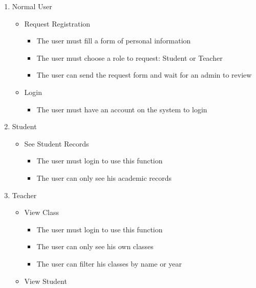 \documentclass[
  letterpaper,
  DIV=11,
  numbers=noendperiod]{scrreprt}
\providecommand{\tightlist}{%
  \setlength{\itemsep}{0pt}\setlength{\parskip}{0pt}}\usepackage{longtable,booktabs,array}
\begin{document}
\begin{enumerate}
\def\labelenumi{\arabic{enumi}.}
\tightlist
\item
  Normal User

  \begin{itemize}
  \tightlist
  \item
    Request Registration

    \begin{itemize}
    \tightlist
    \item
      The user must fill a form of personal information
    \item
      The user must choose a role to request: Student or Teacher
    \item
      The user can send the request form and wait for an admin to review
    \end{itemize}
  \item
    Login

    \begin{itemize}
    \tightlist
    \item
      The user must have an account on the system to login
    \end{itemize}
  \end{itemize}
\item
  Student

  \begin{itemize}
  \tightlist
  \item
    See Student Records

    \begin{itemize}
    \tightlist
    \item
      The user must login to use this function
    \item
      The user can only see his academic records
    \end{itemize}
  \end{itemize}
\item
  Teacher

  \begin{itemize}
  \tightlist
  \item
    View Class

    \begin{itemize}
    \tightlist
    \item
      The user must login to use this function
    \item
      The user can only see his own classes
    \item
      The user can filter his classes by name or year
    \end{itemize}
  \item
    View Student


\end{itemize}
\end{enumerate}
\end{document}
